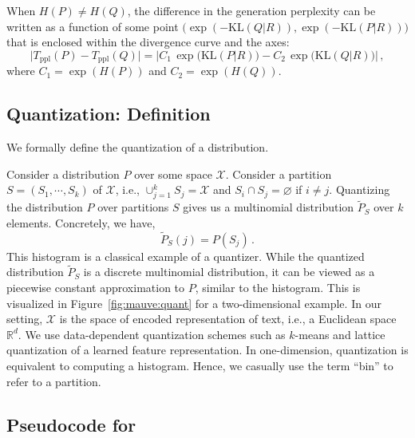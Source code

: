 \documentclass{article}
\newcommand \Xcal {\mathcal X}
\theoremstyle{definition}
\newcommand{\kl}{{\mathrm{KL}}}
\newcommand \reals {\mathbb{R}}
\newcommand{\name}{{\fontfamily{bch}\selectfont{\textsc{Mauve}}}\xspace}
\begin{document}
When $H(P) \neq H(Q)$, the difference in the generation perplexity can be written as a function of 
some point $\big(\exp(-\kl(Q| R)), \exp(-\kl(P|R))\big)$ that is enclosed within the divergence curve and the axes:
\[
     \big|T_{\text{ppl}}(P) - T_{\text{ppl}}(Q)\big|
     =  \Big| C_1 \, \exp\big(\kl(P | R)\big) - C_2 \, \exp\big(\kl(Q | R)\big) \Big| \,,
\]
where $C_1 = \exp(H(P))$ and $C_2 = \exp(H(Q))$.


\subsection{Quantization: Definition} \label{supp:pr:quantization}

%
%
%
%
%
%
%
%
%
%

We formally define the quantization of a distribution. 

%
Consider a distribution $P$ over some space $\Xcal$. Consider a partition $S = (S_1, \cdots, S_k)$ of $\Xcal$, i.e., $\cup_{j=1}^k S_j = \Xcal$ and $S_i \cap S_j = \varnothing$ if $i\neq j$.
%
Quantizing the distribution $P$ over partitions $S$ gives us a multinomial distribution $\tilde P_S$ over $k$ elements. Concretely, we have, 
\[
    \tilde P_S(j) = P(S_j) \, .
\]
This histogram is a classical example of a quantizer. 
%
While the quantized distribution $\tilde P_S$ is a discrete multinomial distribution, it can be viewed as a piecewise constant approximation to $P$, similar to the histogram. This is visualized in Figure~\ref{fig:mauve:quant} for a two-dimensional example.
%
%
%
%
%
%
%
In our setting, $\Xcal$ is the space of  encoded representation of text, i.e., a Euclidean space $\reals^d$. We use data-dependent quantization schemes such as $k$-means and lattice quantization of a learned feature representation.
%
In one-dimension, quantization is equivalent to computing a histogram. Hence, we casually use the term ``bin'' to refer to a partition. 

\subsection{Pseudocode for \name} 
\label{supp:pseudocode}
\end{document}

